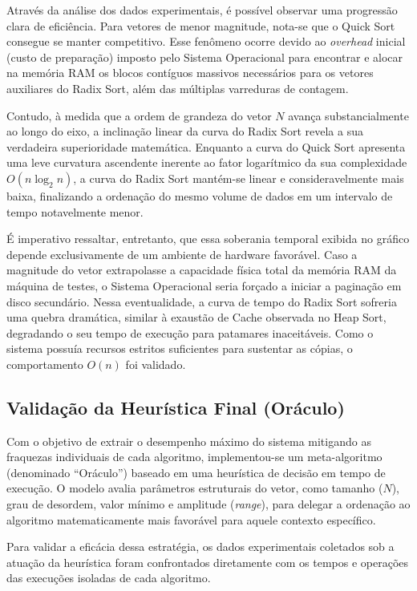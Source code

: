 \documentclass{article}
\begin{document}
    Através da análise dos dados experimentais, é possível observar uma progressão clara de eficiência. Para vetores de menor magnitude, nota-se que o Quick Sort consegue se manter competitivo. Esse fenômeno ocorre devido ao \textit{overhead} inicial (custo de preparação) imposto pelo Sistema Operacional para encontrar e alocar na memória RAM os blocos contíguos massivos necessários para os vetores auxiliares do Radix Sort, além das múltiplas varreduras de contagem.

    Contudo, à medida que a ordem de grandeza do vetor $N$ avança substancialmente ao longo do eixo, a inclinação linear da curva do Radix Sort revela a sua verdadeira superioridade matemática. Enquanto a curva do Quick Sort apresenta uma leve curvatura ascendente inerente ao fator logarítmico da sua complexidade $O(n \log_2 n)$, a curva do Radix Sort mantém-se linear e consideravelmente mais baixa, finalizando a ordenação do mesmo volume de dados em um intervalo de tempo notavelmente menor.

    É imperativo ressaltar, entretanto, que essa soberania temporal exibida no gráfico depende exclusivamente de um ambiente de hardware favorável. Caso a magnitude do vetor extrapolasse a capacidade física total da memória RAM da máquina de testes, o Sistema Operacional seria forçado a iniciar a paginação em disco secundário. Nessa eventualidade, a curva de tempo do Radix Sort sofreria uma quebra dramática, similar à exaustão de Cache observada no Heap Sort, degradando o seu tempo de execução para patamares inaceitáveis. Como o sistema possuía recursos estritos suficientes para sustentar as cópias, o comportamento $O(n)$ foi validado.

    \subsection{Validação da Heurística Final (Oráculo)}
    Com o objetivo de extrair o desempenho máximo do sistema mitigando as fraquezas individuais de cada algoritmo, implementou-se um meta-algoritmo (denominado ``Oráculo'') baseado em uma heurística de decisão em tempo de execução. O modelo avalia parâmetros estruturais do vetor, como tamanho ($N$), grau de desordem, valor mínimo e amplitude (\textit{range}), para delegar a ordenação ao algoritmo matematicamente mais favorável para aquele contexto específico. 

    Para validar a eficácia dessa estratégia, os dados experimentais coletados sob a atuação da heurística foram confrontados diretamente com os tempos e operações das execuções isoladas de cada algoritmo.
\end{document}
